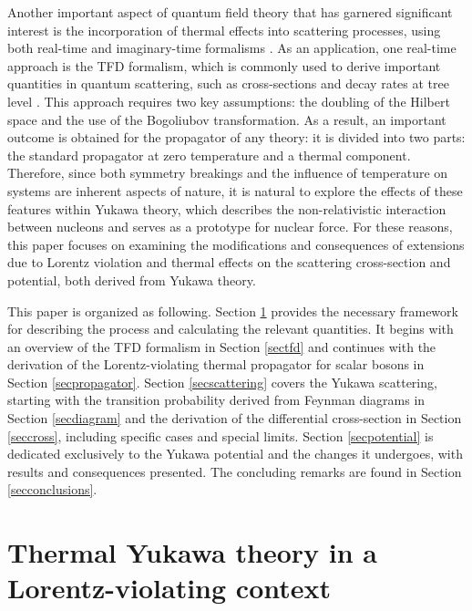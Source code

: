 \documentclass[11pt,showpacs,preprintnumbers,amsmath,amssymb,prd,nofootinbib,superscriptaddress]{revtex4-2}
\begin{document}
Another important aspect of quantum field theory that has garnered significant interest is the incorporation of thermal effects into scattering processes, using both real-time and imaginary-time formalisms \cite{temp00, temp000, khannatfd, temp1, temp2, temp3, temp4}. As an application, one real-time approach is the TFD formalism, which is commonly used to derive important quantities in quantum scattering, such as cross-sections and decay rates at tree level \cite{scatter2, santos2022temperature, santos2016quantized,santos2019thermal}. This approach requires two key assumptions: the doubling of the Hilbert space and the use of the Bogoliubov transformation. As a result, an important outcome is obtained for the propagator of any theory: it is divided into two parts: the standard propagator at zero temperature and a thermal component. Therefore, since both symmetry breakings and the influence of temperature on systems are inherent aspects of nature, it is natural to explore the effects of these features within Yukawa theory, which describes the non-relativistic interaction between nucleons and serves as a prototype for nuclear force. For these reasons, this paper focuses on examining the modifications and consequences of extensions due to Lorentz violation and thermal effects on the scattering cross-section and potential, both derived from Yukawa theory. 

This paper is organized as following. Section \ref{sec1} provides the necessary framework for describing the process and calculating the relevant quantities. It begins with an overview of the TFD formalism in Section \ref{sectfd} and continues with the derivation of the Lorentz-violating thermal propagator for scalar bosons in Section \ref{secpropagator}. Section \ref{secscattering} covers the Yukawa scattering, starting with the transition probability derived from Feynman diagrams in Section \ref{secdiagram} and the derivation of the differential cross-section in Section \ref{seccross}, including specific cases and special limits. Section \ref{secpotential} is dedicated exclusively to the Yukawa potential and the changes it undergoes, with results and consequences presented. The concluding remarks are found in Section \ref{secconclusions}.


\section{Thermal Yukawa theory in a Lorentz-violating context}\label{sec1}
\end{document}
